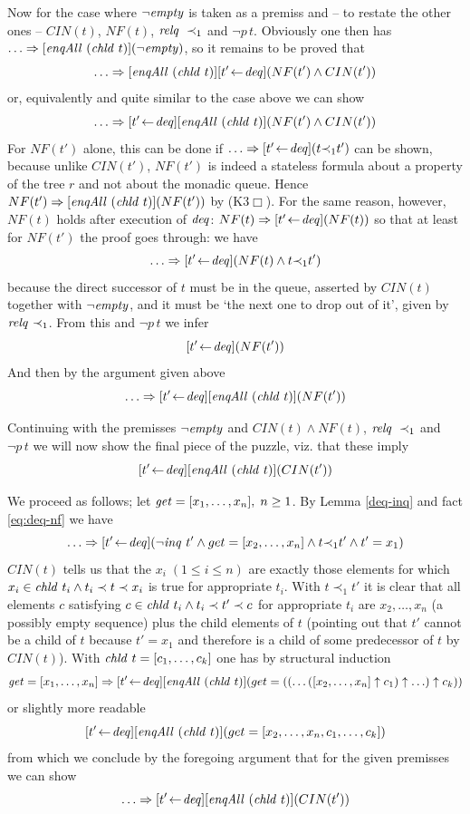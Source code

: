 Now for the case where $\lnot \mathit{empty}$ is taken as a premiss and -- to restate the
other ones -- $CIN(t)$, $NF(t)$, $\mathit{relq}~\prec_1$ and $\lnot p\,t$. Obviously one then has
$\ldots \Rightarrow [\mathit{enqAll}~(\mathit{chld}~t)](\lnot \mathit{empty})$, so it remains to be proved that
\[
\ldots \Rightarrow [\mathit{enqAll}~(\mathit{chld}~t)][t' \!\gets\! \mathit{deq}](NF(t') \land CIN(t'))
\]
or, equivalently and quite similar to the case above we can show
\[
\ldots \Rightarrow [t' \!\gets\! \mathit{deq}][\mathit{enqAll}~(\mathit{chld}~t)](NF(t') \land CIN(t'))
\]
For $NF(t')$ alone, this can be done if $\ldots \Rightarrow [t' \!\gets\! \mathit{deq}](t {\prec}_1 t')$ can be shown,
because unlike $CIN(t')$, $NF(t')$ is indeed a stateless formula about a
property of the tree $r$ and not about the monadic queue. Hence $NF(t') \Rightarrow
[\mathit{enqAll}~(\mathit{chld}~t)](NF(t'))$ by (K3$\Box$). For
the same reason, however, $NF(t)$ holds after execution of $\mathit{deq}$: $NF(t) \Rightarrow [t'
\!\gets\! \mathit{deq}](NF(t))$ so that at least for $NF(t')$ the proof goes through: we have
\begin{equation}
\label{eq:deq-nf}
\ldots \Rightarrow [t' \!\gets\! \mathit{deq}](NF(t) \land t {\prec}_1 t')
\end{equation}
because the direct successor of $t$ must be in the queue, asserted by $CIN(t)$
together with $\lnot\mathit{empty}$, and it must be `the next one to drop out of it', given
by $\mathit{relq}~{\prec}_1$. From this and $\lnot p\,t$ we infer
\[
[t' \!\gets\! \mathit{deq}](NF(t'))
\]
And then by the argument given above
\[
\ldots \Rightarrow [t' \!\gets\! \mathit{deq}][\mathit{enqAll}~(\mathit{chld}~t)](NF(t'))
\]

Continuing with the premisses $\lnot \mathit{empty}$ and $CIN(t) \land NF(t)$, $\mathit{relq}~\prec_1$ and $\lnot
p\,t$ we will now show the final piece of the puzzle, viz. that these imply
\begin{equation}
\label{peter}
[t' \!\gets\! \mathit{deq}][\mathit{enqAll}~(\mathit{chld}~t)](CIN(t'))
\end{equation}

We proceed as follows; let $\mathit{get} = [x_1,\ldots,x_n],\; n \geq 1$.  By Lemma
\ref{deq-inq} and fact \eqref{eq:deq-nf} we have
\[
\ldots \Rightarrow [t' \!\gets\! \mathit{deq}](\lnot \mathit{inq}~t' \land get = [x_2,\ldots, x_n] \land t {\prec}_1 t' \land t' = x_1)
\]
$CIN(t)$ tells us that the $x_i\; (1\leq i\leq n)$ are exactly those elements for which
$x_i \in \mathit{chld}~t_i \land t_i \prec t \prec x_i$ is true for appropriate $t_i$. With $t \prec_1 t'$
it is clear that all elements $c$ satisfying $c \in \mathit{chld}~t_i \land t_i \prec t' \prec c$ for
appropriate $t_i$ are $x_2,\ldots,x_n$ (a possibly empty sequence) plus the child
elements of $t$ (pointing out that $t'$ cannot be a child of $t$ because
$t' = x_1$ and therefore is a child of some predecessor of $t$ by $CIN(t)$). With
$\mathit{chld}~t = [c_1,\ldots,c_k]$ one has by structural induction
\[
\mathit{get} = [x_1,\ldots,x_n] \Rightarrow [t' \!\gets\! \mathit{deq}][\mathit{enqAll}~(\mathit{chld}~t)](get = ((\ldots([x_2,\ldots,x_n]\uparrow c_1)\uparrow \ldots ) \uparrow c_k))
\]
or slightly more readable
\[
[t' \!\gets\! \mathit{deq}][\mathit{enqAll}~(\mathit{chld}~t)](get = [x_2,\ldots,x_n,c_1,\ldots,c_k])
\]
from which we conclude by the foregoing argument that for the given premisses we
can show
\[
\ldots \Rightarrow [t' \!\gets\! \mathit{deq}][\mathit{enqAll}~(\mathit{chld}~t)](CIN(t'))
\]

